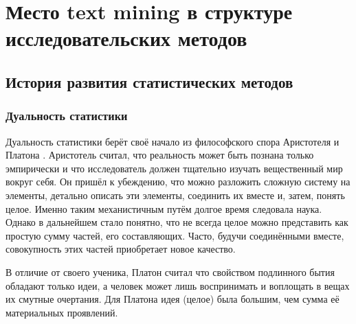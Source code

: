 \chapter{Место text mining в структуре исследовательских методов} \label{chapt1}
\section{История развития статистических методов} \label{sect1_1}
\subsection{Дуальность статистики}\label{subsect1_1_1}
Дуальность статистики берёт своё начало из философского спора Аристотеля и Платона \cite[стр. 7]{handbook_stat_dm}. Аристотель считал, что реальность может быть познана только эмпирически и что исследователь должен тщательно изучать вещественный мир вокруг себя. Он пришёл к убеждению, что можно разложить сложную систему на элементы, детально описать эти элементы, соединить их вместе и, затем, понять целое. Именно таким механистичным путём долгое время следовала наука. Однако в дальнейшем стало понятно, что не всегда целое можно представить как простую сумму частей, его составляющих. Часто, будучи соединёнными вместе, совокупность этих частей приобретает новое качество.

В отличие от своего ученика, Платон считал что свойством подлинного бытия обладают только идеи, а человек может лишь воспринимать и воплощать в вещах их смутные очертания. Для Платона идея (целое) была большим, чем сумма её материальных проявлений.

